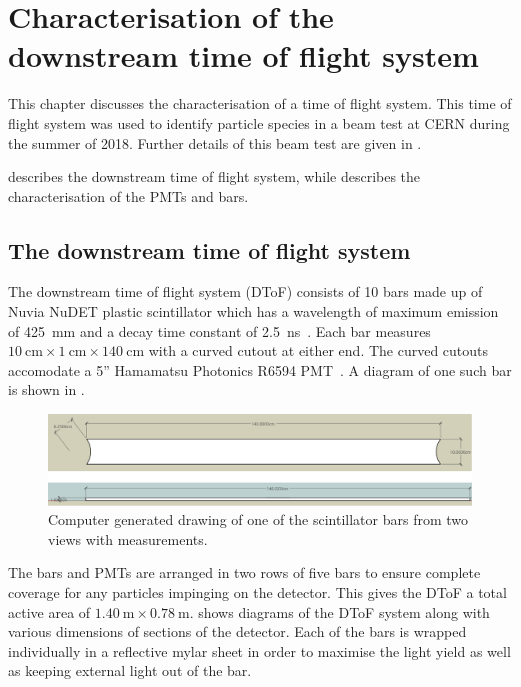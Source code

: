 \chapter{Characterisation of the downstream time of flight system}
\label{sec:hptpc_dtof_characterisation}

This chapter discusses the characterisation of a time of flight system.
This time of flight system was used to identify particle species in a beam test at CERN during the summer of 2018.
Further details of this beam test are given in .

 describes the downstream time of flight system, while  describes the characterisation of the PMTs and bars.

\section{The downstream time of flight system}
\label{sec:hptpc_dtof_characterisation:dtof}

The downstream time of flight system (DToF) consists of 10 bars made up of Nuvia NuDET plastic scintillator which has a wavelength of maximum emission of \SI{425}{\milli\metre} and a decay time constant of \SI{2.5}{\nano\second}~\cite{nuvia}.
Each bar measures $\SI{10}{\centi\metre} \times \SI{1}{\centi\metre} \times \SI{140}{\centi\metre}$ with a curved cutout at either end.
The curved cutouts accomodate a 5'' Hamamatsu Photonics R6594 PMT~\cite{hamamatsu}.
A diagram of one such bar is shown in .

\begin{figure}
  \centering
  \includegraphics[width=.8\linewidth]{files/figures/hptpc_dtof_characterisation/barDiag}
  \caption[HPTPC DToF bar diagram.]{Computer generated drawing of one of the scintillator bars from two views with measurements.}
  \label{fig:barDiag}
\end{figure}

The bars and PMTs are arranged in two rows of five bars to ensure complete coverage for any particles impinging on the detector.
This gives the DToF a total active area of $\SI{1.40}{\metre} \times \SI{0.78}{\metre}$.
 shows diagrams of the DToF system along with various dimensions of sections of the detector.
Each of the bars is wrapped individually in a reflective mylar sheet in order to maximise the light yield as well as keeping external light out of the bar.

